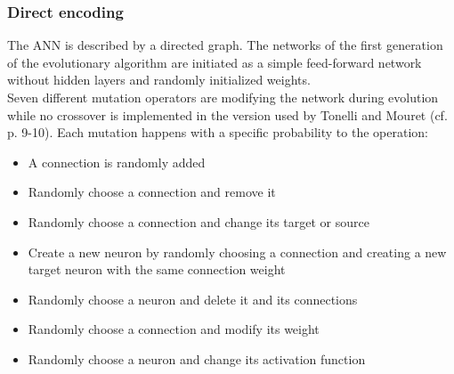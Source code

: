 \documentclass[12pt,twoside]{article}
\theoremstyle{plain}
\theoremstyle{definition}
\theoremstyle{remark}
\begin{document}
\subsubsection{Direct encoding}
The ANN is described by a directed graph. The networks of the first generation of the evolutionary algorithm are initiated as a simple feed-forward network without hidden layers and randomly initialized weights.\\
Seven different mutation operators are modifying the network during evolution while no crossover is implemented in the version used by Tonelli and Mouret (cf. \cite{citeulike:12788284} p. 9-10).
Each mutation happens with a specific probability to the operation:
\begin{itemize}
	\item A connection is randomly added
	\item Randomly choose a connection and remove it
	\item Randomly choose a connection and change its target or source
	\item Create a new neuron by randomly choosing a connection and creating a new target neuron with the same connection weight
	\item Randomly choose a neuron and delete it and its connections
	\item Randomly choose a connection and modify its weight
	\item Randomly choose a neuron and change its activation function
\end{itemize}
\end{document}
